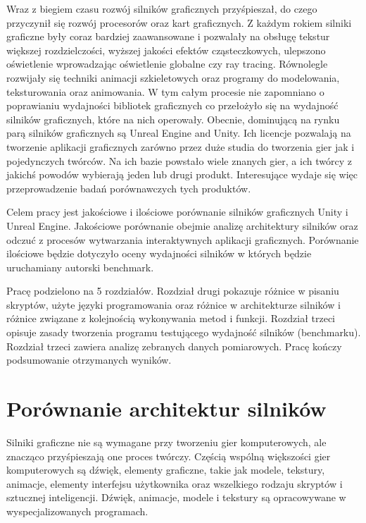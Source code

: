 \documentclass[12pt,twoside]{article}
\begin{document}
Wraz z biegiem czasu rozwój silników graficznych przyśpieszał, do czego przyczynił się rozwój
procesorów oraz kart graficznych. Z każdym rokiem silniki graficzne były coraz bardziej
zaawansowane i pozwalały na obsługę tekstur większej rozdzielczości, wyższej jakości efektów
cząsteczkowych, ulepszono oświetlenie wprowadzając oświetlenie globalne czy ray tracing.
Równolegle rozwijały się techniki animacji szkieletowych oraz programy do modelowania,
teksturowania oraz animowania. W tym całym procesie nie zapomniano o poprawianiu wydajności
bibliotek graficznych co przełożyło się na wydajność silników graficznych, które na nich operowały.
Obecnie, dominującą na rynku parą silników graficznych są Unreal Engine and Unity. Ich licencje
pozwalają na tworzenie aplikacji graficznych zarówno przez duże studia do tworzenia gier jak
i pojedynczych twórców. Na ich bazie powstało wiele znanych gier, a ich twórcy z jakichś powodów
wybierają jeden lub drugi produkt. Interesujące wydaje się więc przeprowadzenie badań
porównawczych tych produktów.

Celem pracy jest jakościowe i ilościowe porównanie silników graficznych Unity i Unreal Engine.
Jakościowe porównanie obejmie analizę architektury silników oraz odczuć z procesów wytwarzania
interaktywnych aplikacji graficznych. Porównanie ilościowe będzie dotyczyło oceny wydajności
silników w których będzie uruchamiany autorski benchmark.

Pracę podzielono na 5 rozdziałów. Rozdział drugi pokazuje różnice w pisaniu skryptów, użyte języki
programowania oraz różnice w architekturze silników i różnice związane z kolejnością wykonywania
metod i funkcji. Rozdział trzeci opisuje zasady tworzenia programu testującego wydajność silników
(benchmarku). Rozdział trzeci zawiera analizę zebranych danych pomiarowych. Pracę kończy
podsumowanie otrzymanych wyników.


\clearpage


\section{Porównanie architektur silników}

Silniki graficzne nie są wymagane przy tworzeniu gier komputerowych, ale
znacząco przyśpieszają one proces twórczy. Częścią wspólną większości gier
komputerowych są dźwięk, elementy graficzne, takie jak modele, tekstury,
animacje, elementy interfejsu użytkownika oraz wszelkiego rodzaju skryptów i
sztucznej inteligencji. Dźwięk, animacje, modele i tekstury są opracowywane w
wyspecjalizowanych programach. 
\end{document}
